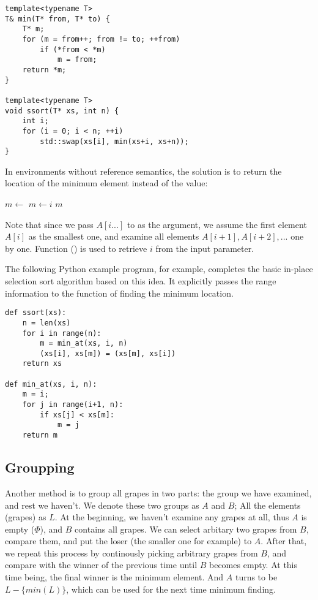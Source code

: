 \documentclass{article}
\begin{document}
\lstset{language=C++}
\begin{lstlisting}
template<typename T>
T& min(T* from, T* to) {
    T* m;
    for (m = from++; from != to; ++from)
        if (*from < *m)
            m = from;
    return *m;
}

template<typename T>
void ssort(T* xs, int n) {
    int i;
    for (i = 0; i < n; ++i)
        std::swap(xs[i], min(xs+i, xs+n));
}
\end{lstlisting}

In environments without reference semantics, the solution is to return the location
of the minimum element instead of the value:

\begin{algorithmic}
  \State $m \gets$ 
      \State $m \gets i$
    \EndIf
  \EndFor
  \State \Return $m$
\EndFunction
\end{algorithmic}

Note that since we pass $A[i...]$ to  as the argument, we assume the first
element $A[i]$ as the smallest one, and examine all elements $A[i+1], A[i+2], ...$ one by one.
Function () is used to retrieve $i$ from the input parameter.

The following Python example program, for example, completes the basic in-place
selection sort algorithm based on this idea. It explicitly passes the range information
to the function of finding the minimum location.

\lstset{language=Python}
\begin{lstlisting}
def ssort(xs):
    n = len(xs)
    for i in range(n):
        m = min_at(xs, i, n)
        (xs[i], xs[m]) = (xs[m], xs[i])
    return xs

def min_at(xs, i, n):
    m = i;
    for j in range(i+1, n):
        if xs[j] < xs[m]:
            m = j
    return m
\end{lstlisting}

\subsection{Groupping}
Another method is to group all grapes in two parts: the group we have examined, and rest we
haven't. We denote these two groups as $A$ and $B$; All the elements (grapes) as $L$. 
At the beginning, we haven't examine any grapes at all, thus $A$ is empty ($\Phi$), and
$B$ contains all grapes. We can select arbitary two grapes from $B$, compare them, and 
put the loser (the smaller one for example) to $A$. After that, we repeat this process
by continously picking arbitrary grapes from $B$, and compare with the winner of the
previous time until $B$ becomes empty. At this time being, the final winner is the
minimum element. And $A$ turns to be $L - \{min(L)\}$, which can be used for the next
time minimum finding.
\end{document}
